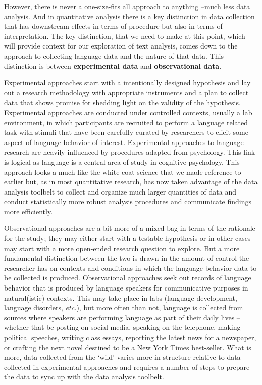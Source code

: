 \documentclass[
  letterpaper,
]{scrbook}
\begin{document}
However, there is never a one-size-fits all approach to anything --much
less data analysis. And in quantitative analysis there is a key
distinction in data collection that has downstream effects in terms of
procedure but also in terms of interpretation. The key distinction, that
we need to make at this point, which will provide context for our
exploration of text analysis, comes down to the approach to collecting
language data and the nature of that data. This distinction is between
\textbf{experimental data} and
\textbf{observational data}.

Experimental approaches start with a intentionally designed hypothesis
and lay out a research methodology with appropriate instruments and a
plan to collect data that shows promise for shedding light on the
validity of the hypothesis. Experimental approaches are conducted under
controlled contexts, usually a lab environment, in which participants
are recruited to perform a language related task with stimuli that have
been carefully curated by researchers to elicit some aspect of language
behavior of interest. Experimental approaches to language research are
heavily influenced by procedures adapted from psychology. This link is
logical as language is a central area of study in cognitive psychology.
This approach looks a much like the white-coat science that we made
reference to earlier but, as in most quantitative research, has now
taken advantage of the data analysis toolbelt to collect and organize
much larger quantities of data and conduct statistically more robust
analysis procedures and communicate findings more efficiently.

Observational approaches are a bit more of a mixed bag in terms of the
rationale for the study; they may either start with a testable
hypothesis or in other cases may start with a more open-ended research
question to explore. But a more fundamental distinction between the two
is drawn in the amount of control the researcher has on contexts and
conditions in which the language behavior data to be collected is
produced. Observational approaches seek out records of language behavior
that is produced by language speakers for communicative purposes in
natural(istic) contexts. This may take place in labs (language
development, language disorders, \emph{etc.}), but more often than not,
language is collected from sources where speakers are performing
language as part of their daily lives --whether that be posting on
social media, speaking on the telephone, making political speeches,
writing class essays, reporting the latest news for a newspaper, or
crafting the next novel destined to be a New York Times best-seller.
What is more, data collected from the `wild' varies more in structure
relative to data collected in experimental approaches and requires a
number of steps to prepare the data to sync up with the data analysis
toolbelt.
\end{document}

